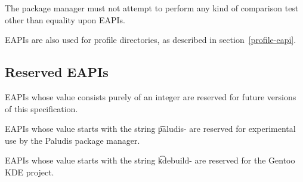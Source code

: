 The package manager must not attempt to perform any kind of comparison test other than equality upon
EAPIs.

EAPIs are also used for profile directories, as described in section~\ref{profile-eapi}.

\subsection{Reserved EAPIs}

\begin{compactitem}
\item EAPIs whose value consists purely of an integer are reserved for future versions of this
    specification.
\item EAPIs whose value starts with the string \t{paludis-} are reserved for experimental
    use by the Paludis package manager.
\item EAPIs whose value starts with the string \t{kdebuild-} are reserved for the Gentoo KDE
    project.
\end{compactitem}


